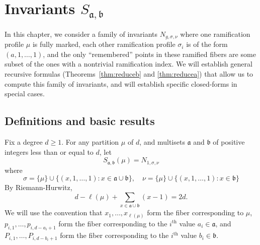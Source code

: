 \documentclass[thesis]{thesis-umich}           %
\renewcommand{\a}{\mathfrak a}
\renewcommand{\b}{\mathfrak b}
\theoremstyle{definition}
\begin{document}
\chapter{Invariants $S_{\a,\b}$}

In this chapter, we consider a family of invariants $N_{g,\sigma,\nu}$ where
one ramification profile
$\mu$ is fully marked,
each other ramification profile $\sigma_i$ is of the form $(a,1,\dots,1)$, and
the only ``remembered'' points in these ramified fibers are some subset of the ones with
a nontrivial ramification index. We will establish general recursive formulas
(Theorems~\ref{thm:reduceb} and \ref{thm:reducea})
that allow us to compute this family of invariants, and will establish
specific closed-forms in special cases.


\section{Definitions and basic results}

Fix a degree $d\geq 1$. For any partition $\mu$ of $d$, and multisets $\a$ and $\b$ of
positive integers less than or equal to $d$, let
\[
S_{\a,\b}(\mu)=N_{1,\sigma,\nu}
\]
where
\[
\sigma=\{\mu\}\cup\{(x,1,\dots,1):x\in\a\cup\b\},\quad \nu=\{\mu\}\cup\{(x,1,\dots,1):x\in\b\}
\]
By Riemann-Hurwitz,
\[
d-\ell(\mu)+\sum_{x\in\a\cup\b}(x-1)=2d.
\]
We will use the convention that $x_1,\dots,x_{\ell(\mu)}$
form the fiber corresponding to $\mu$, $p_{i,1},\dots,p_{i,d-a_i+1}$ form
the fiber corresponding to the $i^{\text{th}}$ value $a_i\in\a$, and
$P_{i,1},\dots,P_{i,d-b_i+1}$ form the fiber corresponding to the
$i^{\text{th}}$ value $b_i\in\b$.
\end{document}
